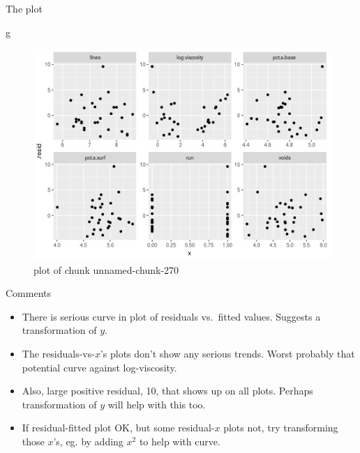 \documentclass[ignorenonframetext,]{beamer}
\newenvironment{Shaded}{\begin{snugshade}}{\end{snugshade}}
\newcommand{\NormalTok}[1]{#1}
\providecommand{\tightlist}{%
  \setlength{\itemsep}{0pt}\setlength{\parskip}{0pt}}
\begin{document}
\begin{frame}[fragile]{The plot}
\protect\hypertarget{the-plot-3}{}

\begin{Shaded}
\begin{Highlighting}[]
\NormalTok{g}
\end{Highlighting}
\end{Shaded}

\begin{figure}
\centering
\includegraphics{figure/unnamed-chunk-270-1.png}
\caption{plot of chunk unnamed-chunk-270}
\end{figure}

\end{frame}

\begin{frame}{Comments}
\protect\hypertarget{comments-17}{}

\begin{itemize}
\tightlist
\item
  There is serious curve in plot of residuals vs.~fitted values.
  Suggests a transformation of \(y\).
\item
  The residuals-vs-\(x\)'s plots don't show any serious trends. Worst
  probably that potential curve against log-viscosity.
\item
  Also, large positive residual, 10, that shows up on all plots. Perhaps
  transformation of \(y\) will help with this too.
\item
  If residual-fitted plot OK, but some residual-\(x\) plots not, try
  transforming those \(x\)'s, eg. by adding \(x^2\) to help with curve.
\end{itemize}

\end{frame}
\end{document}
